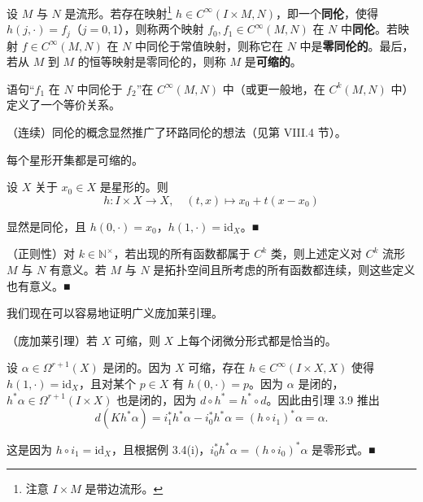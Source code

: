 设 $ M $ 与 $ N $ 是流形。若存在映射\footnote{注意 $ I \times M $ 是带边流形。} $ h \in C^{\infty}(I \times M, N) $，即一个\textbf{同伦}，使得 $ h(j, \cdot) = f_{j} $（$ j = 0, 1 $），则称两个映射 $ f_{0}, f_{1} \in C^{\infty}(M, N) $ 在 $ N $ 中\textbf{同伦}。若映射 $ f \in C^{\infty}(M, N) $ 在 $ N $ 中同伦于常值映射，则称它在 $ N $ 中是\textbf{零同伦的}。最后，若从 $ M $ 到 $ M $ 的恒等映射是零同伦的，则称 $ M $ 是\textbf{可缩的}。

\begin{remark}

\begin{items}
\item

语句“$ f_{1} $ 在 $ N $ 中同伦于 $ f_{2} $”在 $ C^{\infty}(M, N) $ 中（或更一般地，在 $ C^{k}(M, N) $ 中）定义了一个等价关系。

\item

（连续）同伦的概念显然推广了环路同伦的想法（见第 VIII.4 节）。

\item

每个星形开集都是可缩的。

\proofhead
设 $ X $ 关于 $ x_{0} \in X $ 是星形的。则
\[
h : I \times X \to X ,\quad (t, x) \mapsto x_{0} + t(x - x_{0})
\]

显然是同伦，且 $ h(0, \cdot) = x_{0} $，$ h(1, \cdot) = \mathrm{id}_{X} $。\nobreak\hspace{0.35em}■

\item

（正则性）对 $ k \in \mathbb{N}^{\times} $，若出现的所有函数都属于 $ C^{k} $ 类，则上述定义对 $ C^{k} $ 流形 $ M $ 与 $ N $ 有意义。若 $ M $ 与 $ N $ 是拓扑空间且所考虑的所有函数都连续，则这些定义也有意义。\nobreak\hspace{0.35em}■

\end{items}

我们现在可以容易地证明广义庞加莱引理。

\end{remark}

\begin{theorem}

（庞加莱引理）若 $ X $ 可缩，则 $ X $ 上每个闭微分形式都是恰当的。

\proofhead
设 $ \alpha \in \Omega^{r+1}(X) $ 是闭的。因为 $ X $ 可缩，存在 $ h \in C^{\infty}(I \times X, X) $ 使得 $ h(1, \cdot) = \mathrm{id}_{X} $，且对某个 $ p \in X $ 有 $ h(0, \cdot) = p $。因为 $ \alpha $ 是闭的，$ h^{\ast}\alpha \in \Omega^{r+1}(I \times X) $ 也是闭的，因为 $ d \circ h^{\ast} = h^{\ast} \circ d $。因此由引理 3.9 推出
\[
d(Kh^{\ast}\alpha) = i_{1}^{\ast}h^{\ast}\alpha - i_{0}^{\ast}h^{\ast}\alpha = (h \circ i_{1})^{\ast}\alpha = \alpha.
\]

这是因为 $ h \circ i_{1} = \mathrm{id}_{X} $，且根据例 3.4(i)，$ i_{0}^{\ast}h^{\ast}\alpha = (h \circ i_{0})^{\ast}\alpha $ 是零形式。\nobreak\hspace{0.35em}■

\end{theorem}

